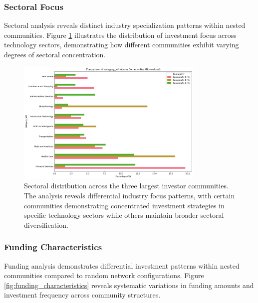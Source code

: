 \documentclass[12pt]{article}
\begin{document}

\subsubsection{Sectoral Focus}

Sectoral analysis reveals distinct industry specialization patterns within nested communities. Figure \ref{fig:sectoral_distribution} illustrates the distribution of investment focus across technology sectors, demonstrating how different communities exhibit varying degrees of sectoral concentration.

\begin{figure}[htbp]
\centering
\includegraphics[width=0.8\textwidth]{./assets/sectorial-distribution.png}
\caption{Sectoral distribution across the three largest investor communities. The analysis reveals differential industry focus patterns, with certain communities demonstrating concentrated investment strategies in specific technology sectors while others maintain broader sectoral diversification.}
\label{fig:sectoral_distribution}
\end{figure}



\subsubsection{Funding Characteristics}

Funding analysis demonstrates differential investment patterns within nested communities compared to random network configurations. Figure \ref{fig:funding_characteristics} reveals systematic variations in funding amounts and investment frequency across community structures.
\end{document}
